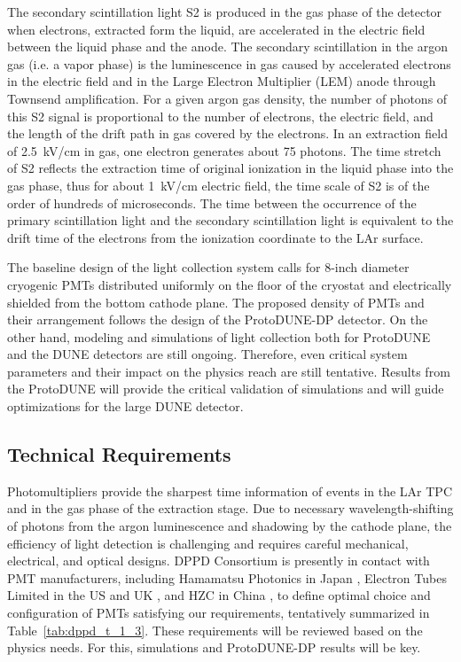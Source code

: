 The secondary scintillation light S2 is produced in the gas phase of the detector when electrons, extracted form the liquid, are accelerated in the electric field between the liquid phase and the anode. The secondary scintillation in the argon gas (i.e. a vapor phase) is the luminescence in gas caused by accelerated electrons in the electric field and in the Large Electron Multiplier (LEM) anode through Townsend amplification. For a given argon gas density, the number of photons of this S2 signal is proportional to the number of electrons, the electric field, and the length of the drift path in gas covered by the electrons. In an extraction field of \SI{2.5}{kV/cm} in gas, one electron generates about \num{75} photons. The time stretch of S2 reflects the extraction time of original ionization in the liquid phase into the gas phase, thus for about \SI{1}{kV/cm} electric field, the time scale of S2 is of the order of hundreds of microseconds. The time between the occurrence of the primary scintillation light and the secondary scintillation light is equivalent to the drift time of the electrons from the ionization coordinate to the LAr surface.

The baseline design of the light collection system calls for 8-inch diameter cryogenic PMTs distributed uniformly on the floor of the cryostat and electrically shielded from the bottom cathode plane. The proposed density of PMTs and their arrangement follows the design of the ProtoDUNE-DP detector. On the other hand, modeling and simulations of light collection both for ProtoDUNE and the DUNE detectors are still ongoing. Therefore, even critical system parameters and their impact on the physics reach are still tentative. Results from the ProtoDUNE will provide the critical validation of simulations and will guide optimizations for the large DUNE detector.

\subsection{Technical Requirements}
\label{sec:fddp-pd-1.3}

Photomultipliers provide the sharpest time information of events in the LAr TPC and in the gas phase of the extraction stage. Due to necessary wavelength-shifting of photons from the argon luminescence and shadowing by the cathode plane, the efficiency of light detection is challenging and requires careful mechanical, electrical, and optical designs. DPPD Consortium is presently in contact with PMT manufacturers, including Hamamatsu Photonics in Japan \cite{hamamatsu}, Electron Tubes Limited in the US and UK \cite{electrontubeslim}, and HZC in China \cite{hzc}, to define optimal choice and configuration of PMTs satisfying our requirements, tentatively summarized in Table~\ref{tab:dppd_t_1_3}. These requirements will be reviewed based on the physics needs. For this, simulations and ProtoDUNE-DP results will be key.

